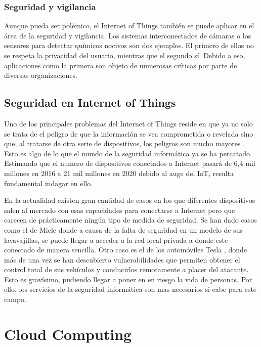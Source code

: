 \subsubsection{Seguridad y vigilancia}

Aunque pueda ser polémico, el Internet of Things también se puede aplicar en el área de la seguridad y vigilancia. Los sistemas interconectados de cámaras o los sensores para detectar químicos nocivos son dos ejemplos. El primero de ellos no se respeta la privacidad del usuario, mientras que el segundo sí. Debido a eso, aplicaciones como la primera son objeto de numerosas críticas por parte de diversas organizaciones.

\subsection{Seguridad en Internet of Things}

Uno de los principales problemas del Internet of Things reside en que ya no solo se trata de el peligro de que la información se vea comprometida o revelada sino que, al tratarse de otra serie de dispositivos, los peligros son mucho mayores \cite{iot-qz}\cite{iot-techradar}. Esto es algo de lo que el mundo de la seguridad informática ya se ha percatado. Estimando que el numero de dispositivos conectados a Internet pasará de 6,4 mil millones en 2016 a 21 mil millones en 2020 \cite{iot-searchdatacenter} debido al auge del IoT, resulta fundamental indagar en ello. 

En la actualidad existen gran cantidad de casos en los que diferentes dispositivos salen al mercado con esas capacidades para conectarse a Internet pero que carecen de prácticamente ningún tipo de medida de seguridad. Se han dado casos como el de Miele \cite{iot-miele} donde a causa de la falta de seguridad en un modelo de sus lavavajillas, se puede llegar a acceder a la red local privada a donde este conectado de manera sencilla. Otro caso es el de los automóviles Tesla \cite{iot-tesla}, donde más de una vez se han descubierto vulnerabilidades que permiten obtener el control total de sus vehículos y conducirlos remotamente a placer del atacante. Esto es gravísimo, pudiendo llegar a poner en en riesgo la vida de personas. Por ello, los servicios de la seguridad informática son mas necesarios si cabe para este campo. 


\section{Cloud Computing}

